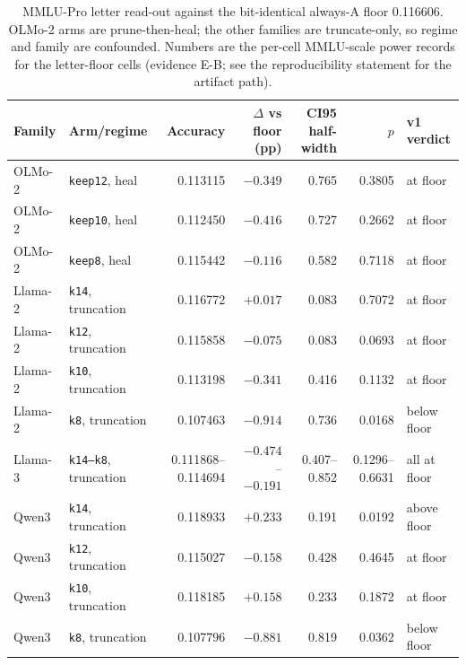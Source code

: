 \begin{table}[t]
\centering
\scriptsize
\setlength{\tabcolsep}{2.6pt}
\begin{tabular}{llrrrrl}
\toprule
Family & Arm/regime & Accuracy & $\Delta$ vs floor (pp) & CI95 half-width & $p$ & v1 verdict \\
\midrule
OLMo-2 & \texttt{keep12}, heal & 0.113115 & $-0.349$ & 0.765 & 0.3805 & at floor \\
OLMo-2 & \texttt{keep10}, heal & 0.112450 & $-0.416$ & 0.727 & 0.2662 & at floor \\
OLMo-2 & \texttt{keep8}, heal & 0.115442 & $-0.116$ & 0.582 & 0.7118 & at floor \\
Llama-2 & \texttt{k14}, truncation & 0.116772 & $+0.017$ & 0.083 & 0.7072 & at floor \\
Llama-2 & \texttt{k12}, truncation & 0.115858 & $-0.075$ & 0.083 & 0.0693 & at floor \\
Llama-2 & \texttt{k10}, truncation & 0.113198 & $-0.341$ & 0.416 & 0.1132 & at floor \\
Llama-2 & \texttt{k8}, truncation & 0.107463 & $-0.914$ & 0.736 & 0.0168 & below floor \\
Llama-3 & \texttt{k14--k8}, truncation & 0.111868--0.114694 & $-0.474$--$-0.191$ & 0.407--0.852 & 0.1296--0.6631 & all at floor \\
Qwen3 & \texttt{k14}, truncation & 0.118933 & $+0.233$ & 0.191 & 0.0192 & above floor \\
Qwen3 & \texttt{k12}, truncation & 0.115027 & $-0.158$ & 0.428 & 0.4645 & at floor \\
Qwen3 & \texttt{k10}, truncation & 0.118185 & $+0.158$ & 0.233 & 0.1872 & at floor \\
Qwen3 & \texttt{k8}, truncation & 0.107796 & $-0.881$ & 0.819 & 0.0362 & below floor \\
\bottomrule
\end{tabular}
\caption{MMLU-Pro letter read-out against the bit-identical always-A floor 0.116606. OLMo-2 arms are prune-then-heal; the other families are truncate-only, so regime and family are confounded. Numbers are the per-cell MMLU-scale power records for the letter-floor cells (evidence \textsf{E-B}; see the reproducibility statement for the artifact path).}
\label{tab:mmlupro}
\end{table}
